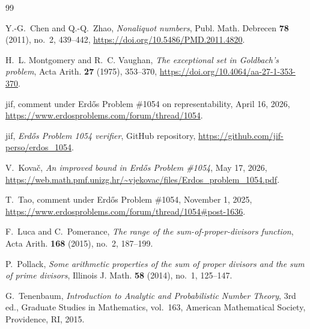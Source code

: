 \documentclass[11pt]{article}
\theoremstyle{remark}
\newcommand{\1}{\mathbf 1}
\begin{document}
\begin{thebibliography}{99}

Y.-G.~Chen and Q.-Q.~Zhao,
\emph{Nonaliquot numbers},
Publ. Math. Debrecen \textbf{78} (2011), no.~2, 439--442,
\url{https://doi.org/10.5486/PMD.2011.4820}.

H.~L. Montgomery and R.~C. Vaughan,
\emph{The exceptional set in Goldbach's problem},
Acta Arith. \textbf{27} (1975), 353--370,
\url{https://doi.org/10.4064/aa-27-1-353-370}.

jif,
comment under Erd\H{o}s Problem \#1054 on representability,
April 16, 2026,
\url{https://www.erdosproblems.com/forum/thread/1054}.

jif,
\emph{Erd\H{o}s Problem 1054 verifier},
GitHub repository,
\url{https://github.com/jif-perso/erdos_1054}.

V.~Kova\v{c},
\emph{An improved bound in Erd\H{o}s Problem \#1054},
May 17, 2026,
\url{https://web.math.pmf.unizg.hr/~vjekovac/files/Erdos_problem_1054.pdf}.

T.~Tao,
comment under Erd\H{o}s Problem \#1054,
November 1, 2025,
\url{https://www.erdosproblems.com/forum/thread/1054\#post-1636}.

F.~Luca and C.~Pomerance,
\emph{The range of the sum-of-proper-divisors function},
Acta Arith. \textbf{168} (2015), no.~2, 187--199.

P.~Pollack,
\emph{Some arithmetic properties of the sum of proper divisors and the sum
of prime divisors},
Illinois J. Math. \textbf{58} (2014), no.~1, 125--147.

G.~Tenenbaum,
\emph{Introduction to Analytic and Probabilistic Number Theory},
3rd ed., Graduate Studies in Mathematics, vol.~163,
American Mathematical Society, Providence, RI, 2015.

\end{thebibliography}
\end{document}
